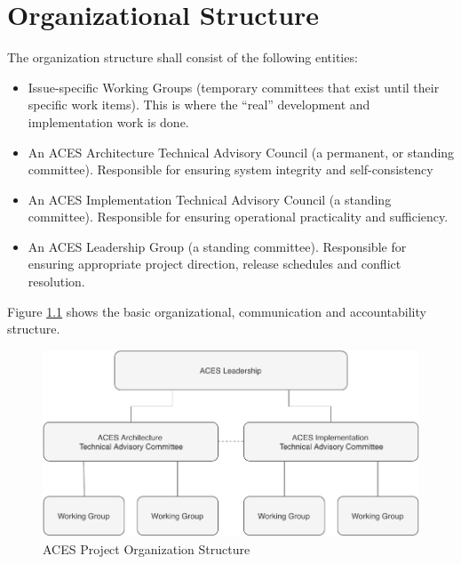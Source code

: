 \chapter{Organizational Structure}

The organization structure shall consist of the following entities: 
\begin{itemize}
    \item Issue-specific Working Groups (temporary committees that exist until their specific work items). This is where the “real” development and implementation work is done.
    \item An ACES Architecture Technical Advisory Council (a permanent, or standing committee).
    Responsible for ensuring system integrity and self-consistency
    \item An ACES Implementation Technical Advisory Council (a standing committee). Responsible for ensuring operational practicality and sufficiency.
    \item An ACES Leadership Group (a standing committee). Responsible for ensuring appropriate project direction, release schedules and conflict resolution.
\end{itemize}
    
Figure \ref{fig:org} shows the basic organizational, communication and accountability structure.

\begin{figure}[htp]
    \centering
    \includegraphics[width=\linewidth]{figures/org.pdf}
    \caption{ACES Project Organization Structure}
    \label{fig:org}
\end{figure}


